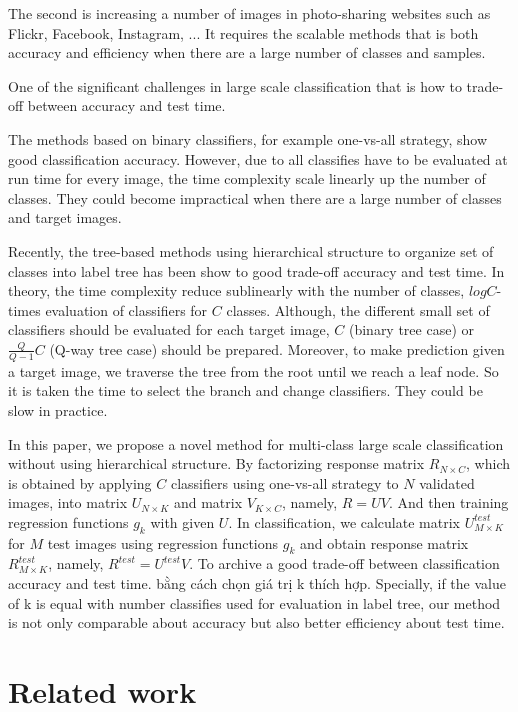 \documentclass[preprint]{elsarticle}
\begin{document}
The second is increasing a number of images in photo-sharing websites such as Flickr, Facebook, Instagram, ... 
It requires the scalable methods that is both accuracy and efficiency when there are a large number of classes and samples.

One of the significant challenges in large scale classification that is how to trade-off between accuracy and test time. 

The methods based on binary classifiers, for example one-vs-all strategy, show good classification accuracy. However, due to all classifies have to be evaluated at run time for every image, the time complexity scale linearly up the number of classes. They could become impractical when there are a large number of classes and target images.

Recently, the tree-based methods using hierarchical structure to organize set of classes into label tree has been show to good trade-off accuracy and test time. In theory, the time complexity reduce sublinearly with the number of classes, $logC$-times evaluation of classifiers for $C$ classes. Although, the different small set of classifiers should be evaluated for each target image, $C$ (binary tree case) or $\frac{Q}{Q-1}C$ (Q-way tree case) should be prepared. Moreover, to make prediction given a target image, we traverse the tree from the root until we reach a leaf node. So it is taken the time to select the branch and change classifiers. They could be slow in practice.

In this paper, we propose a novel method for multi-class large scale classification without using hierarchical structure. By factorizing response matrix $R_{N \times C}$, which is obtained by applying $C$ classifiers using one-vs-all strategy to $N$ validated images,  into matrix $U_{N \times K}$ and matrix $V_{K \times C}$, namely, $R=UV$. And then training regression functions $g_k$ with given $U$. In classification, we calculate matrix $U_{M \times K}^{test}$ for $M$ test images using regression functions $g_k$ and obtain response matrix $R_{M \times K}^{test}$, namely, $R^{test}= U^{test}V$. To archive a good trade-off between classification accuracy and test time. bằng cách chọn giá trị k thích hợp. Specially, if the value of k is equal with number classifies used for evaluation in label tree, our method is not only comparable about accuracy but also  better efficiency about test time.


\section{Related work}
\end{document}
